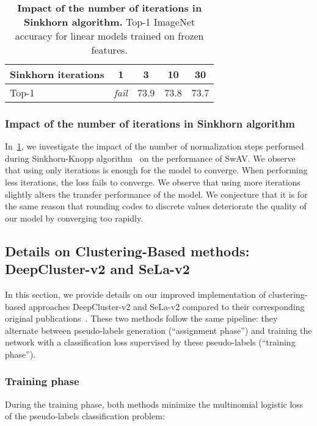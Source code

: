 \documentclass{article}
\def\OURS{SwAV\xspace}
\begin{document}
\begin{table}[b]
\centering
  \caption{
\textbf{Impact of the number of iterations in Sinkhorn algorithm.} Top-1 ImageNet accuracy for linear models trained on frozen features.
}
\vspace{.3em}
\begin{tabular}{l c c c c}
    \toprule
	Sinkhorn iterations & 1 & 3 & 10 & 30 \\
    \midrule
	Top-1 & \textit{fail} & 73.9 & 73.8 & 73.7 \\
    \bottomrule
  \end{tabular}
  \label{tab:iters}
\end{table}

\subsubsection{Impact of the number of iterations in Sinkhorn algorithm}
In~\cref{tab:iters}, we investigate the impact of the number of normalization steps performed during Sinkhorn-Knopp algorithm~\cite{cuturi2013sinkhorn} on the performance of \OURS.
We observe that using only  iterations is enough for the model to converge.
When performing less iterations, the loss fails to converge.
We observe that using more iterations slightly alters the transfer performance of the model.
We conjecture that it is for the same reason that rounding codes to discrete values deteriorate the quality of our model by converging too rapidly.

\subsection{Details on Clustering-Based methods: DeepCluster-v2 and SeLa-v2}
\label{ap:clustering}
In this section, we provide details on our improved implementation of clustering-based approaches DeepCluster-v2 and SeLa-v2 compared to their corresponding original publications~\cite{caron2018deep,asano2019self}.
These two methods follow the same pipeline: they alternate between pseudo-labels generation (``assignment phase'') and training the network with a classification loss supervised by these pseudo-labels (``training phase'').

\subsubsection{Training phase}
During the training phase, both methods minimize the multinomial logistic loss of the pseudo-labels  classification problem:
\end{document}
